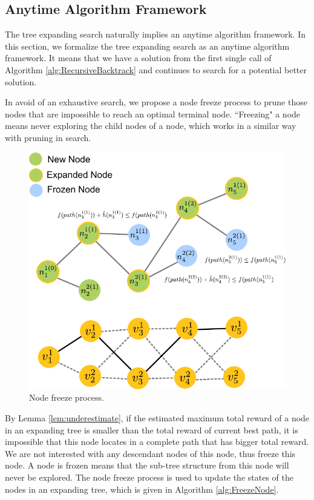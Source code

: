\subsection{Anytime Algorithm Framework}
\label{subsec:anytime_algorithm_framework}

The tree expanding search naturally implies an anytime algorithm framework. 
In this section, we formalize the tree expanding search as an anytime algorithm framework.
It means that we have a solution from the first single call of Algorithm \ref{alg:RecursiveBacktrack} and continues to search for a potential better solution. 

In avoid of an exhaustive search, we propose a node freeze process to prune those nodes that are impossible to reach an optimal terminal node. ``Freezing" a node means never exploring the child nodes of a node, which works in a similar way with pruning in search. 

\begin{figure}
\centering
\includegraphics[width=0.7\linewidth]{./images/freeze_process.pdf}
\caption{Node freeze process.}
\label{fig:freeze_process}
\end{figure}

By Lemma \ref{lem:underestimate}, if the estimated maximum total reward of a node in an expanding tree is smaller than the total reward of current best path, it is impossible that this node locates in a complete path that has bigger total reward.
We are not interested with any descendant nodes of this node, thus freeze this node.
A node is frozen means that the sub-tree structure from this node will never be explored.
The node freeze process is used to update the states of the nodes in an expanding tree, which is given in Algorithm \ref{alg:FreezeNode}.

